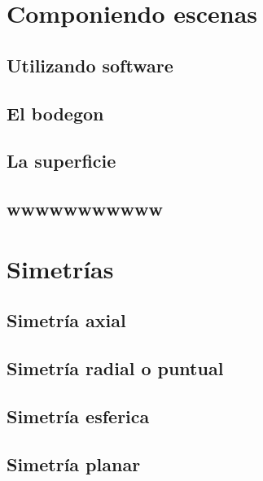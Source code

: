 \documentclass[
  16pt,
]{krantz}
\theoremstyle{definition}
\theoremstyle{definition}
\theoremstyle{definition}
\theoremstyle{definition}
\theoremstyle{remark}
\begin{document}
\hypertarget{componiendo-escenas}{%
\section{Componiendo escenas}\label{componiendo-escenas}}

\hypertarget{utilizando-software}{%
\subsection{Utilizando software}\label{utilizando-software}}

\hypertarget{el-bodegon}{%
\subsection{El bodegon}\label{el-bodegon}}

\hypertarget{la-superficie}{%
\subsection{La superficie}\label{la-superficie}}

\hypertarget{wwwwwwwwwww}{%
\subsection{wwwwwwwwwww}\label{wwwwwwwwwww}}

\hypertarget{simetruxedas}{%
\section{Simetrías}\label{simetruxedas}}

\hypertarget{simetruxeda-axial}{%
\subsection{Simetría axial}\label{simetruxeda-axial}}

\hypertarget{simetruxeda-radial-o-puntual}{%
\subsection{Simetría radial o puntual}\label{simetruxeda-radial-o-puntual}}

\hypertarget{simetruxeda-esferica}{%
\subsection{Simetría esferica}\label{simetruxeda-esferica}}

\hypertarget{simetruxeda-planar}{%
\subsection{Simetría planar}\label{simetruxeda-planar}}
\end{document}
